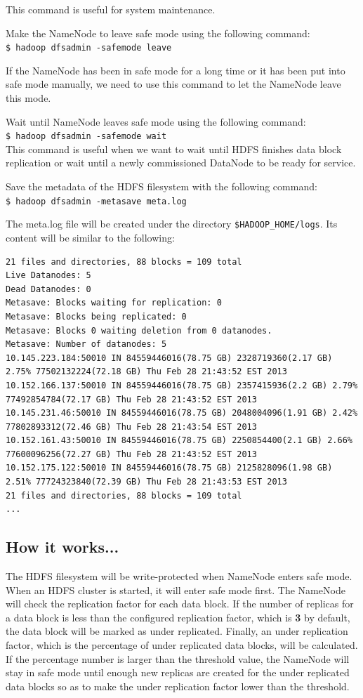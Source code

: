 This command is useful for system maintenance.

Make the NameNode to leave safe mode using the following command: \\
\verb|$ hadoop dfsadmin -safemode leave|

If the NameNode has been in safe mode for a long time or it has been put into safe mode manually, we need to use this command to let the NameNode leave this mode.

Wait until NameNode leaves safe mode using the following command:\\
\verb|$ hadoop dfsadmin -safemode wait|\\
This command is useful when we want to wait until HDFS finishes data block replication or wait until a newly commissioned DataNode to be ready for service.

Save the metadata of the HDFS filesystem with the following command: \\
\verb|$ hadoop dfsadmin -metasave meta.log|

The meta.log file will be created under the directory \verb|$HADOOP_HOME/logs|. Its content will be similar to the following:
\lstset{style=bashstyle}
\begin{lstlisting}
21 files and directories, 88 blocks = 109 total
Live Datanodes: 5
Dead Datanodes: 0
Metasave: Blocks waiting for replication: 0
Metasave: Blocks being replicated: 0
Metasave: Blocks 0 waiting deletion from 0 datanodes.
Metasave: Number of datanodes: 5
10.145.223.184:50010 IN 84559446016(78.75 GB) 2328719360(2.17 GB) 2.75% 77502132224(72.18 GB) Thu Feb 28 21:43:52 EST 2013
10.152.166.137:50010 IN 84559446016(78.75 GB) 2357415936(2.2 GB) 2.79% 77492854784(72.17 GB) Thu Feb 28 21:43:52 EST 2013
10.145.231.46:50010 IN 84559446016(78.75 GB) 2048004096(1.91 GB) 2.42% 77802893312(72.46 GB) Thu Feb 28 21:43:54 EST 2013
10.152.161.43:50010 IN 84559446016(78.75 GB) 2250854400(2.1 GB) 2.66% 77600096256(72.27 GB) Thu Feb 28 21:43:52 EST 2013
10.152.175.122:50010 IN 84559446016(78.75 GB) 2125828096(1.98 GB) 2.51% 77724323840(72.39 GB) Thu Feb 28 21:43:53 EST 2013
21 files and directories, 88 blocks = 109 total
...
\end{lstlisting}

\subsection*{How it works...}
The HDFS filesystem will be write-protected when NameNode enters safe mode. When an HDFS cluster is started, it will enter safe mode first. The NameNode will check the replication factor for each data block. If the number of replicas for a data block is less than the configured replication factor, which is \textbf{3} by default, the data block will be marked as under replicated. Finally, an under replication factor, which is the percentage of under replicated data blocks, will be calculated. If the percentage number is larger than the threshold value, the NameNode will stay in safe mode until enough new replicas are created for the under replicated data blocks so as to make the under replication factor lower than the threshold.

